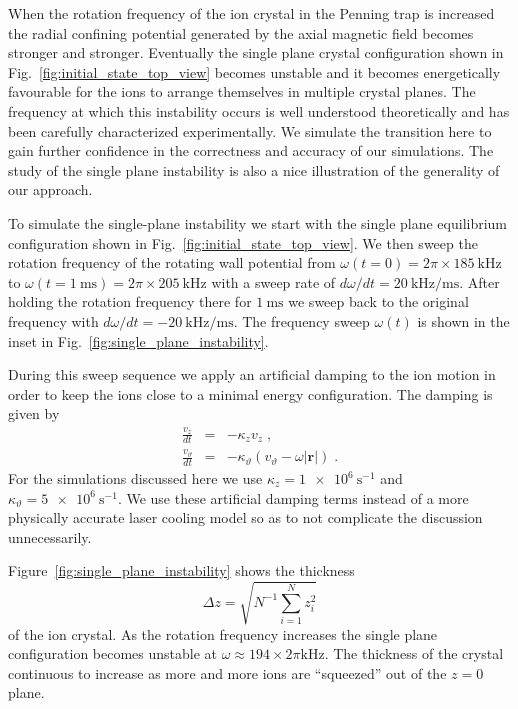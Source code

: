 \documentclass[aps, pra, preprint]{revtex4-1}
\begin{document}
When the rotation frequency of the ion crystal in the Penning
trap is increased the radial confining potential generated by the
axial magnetic field becomes stronger and stronger. Eventually
the single plane crystal configuration shown in
Fig.~\ref{fig:initial_state_top_view} becomes unstable and it
becomes energetically favourable for the ions to arrange
themselves in multiple crystal planes. The frequency at which
this instability occurs is well understood
theoretically and has been carefully
characterized experimentally. We simulate the
transition here to gain further confidence in the correctness and
accuracy of our simulations. The study of the single plane
instability is also a nice illustration of the generality of our
approach.

To simulate the single-plane instability we start with the single
plane equilibrium configuration shown in
Fig.~\ref{fig:initial_state_top_view}. We then sweep the rotation
frequency of the rotating wall potential from
$\omega(t=0)=2\pi\times\SI{185}{\kilo\hertz}$ to
$\omega(t=\SI{1}{\milli\second})=2\pi\times\SI{205}{\kilo\hertz}$ with
a sweep rate of $d\omega/dt =
\SI{20}{\kilo\hertz/\milli\second}$. After holding the rotation
frequency there for $\SI{1}{\milli\second}$ we sweep back to the
original frequency with
$d\omega/dt=-\SI{20}{\kilo\hertz/\milli\second}$. The frequency
sweep $\omega(t)$ is shown in the inset in
Fig.~\ref{fig:single_plane_instability}.

During this sweep sequence we apply an artificial damping to the
ion motion in order to keep the ions close to a minimal energy
configuration. The damping is given by
\begin{eqnarray}
  \frac{v_z}{dt}&=&-\kappa_z v_z\;,\\
  \frac{v_\vartheta}{dt}&=&-\kappa_\vartheta\left( v_\vartheta -
                            \omega\left| \mathbf{r} \right| \right)\;.
\end{eqnarray}
For the simulations discussed here we use
$\kappa_z=\SI{1e6}{\second^{-1}}$ and
$\kappa_\vartheta=\SI{5e6}{\second^{-1}}$. We use these
artificial damping terms instead of a more physically accurate
laser cooling model so as to not complicate the discussion
unnecessarily.

Figure~\ref{fig:single_plane_instability} shows the thickness
\begin{equation}
  \Delta z=\sqrt{N^{-1}\sum_{i=1}^N z_i^2}
\end{equation}
of the ion crystal. As the rotation frequency increases the
single plane configuration becomes unstable at $\omega\approx
194\times 2\pi\si{\kilo\hertz}$. The thickness of the crystal
continuous to increase as more and more ions are ``squeezed'' out
of the $z=0$ plane.
\end{document}
